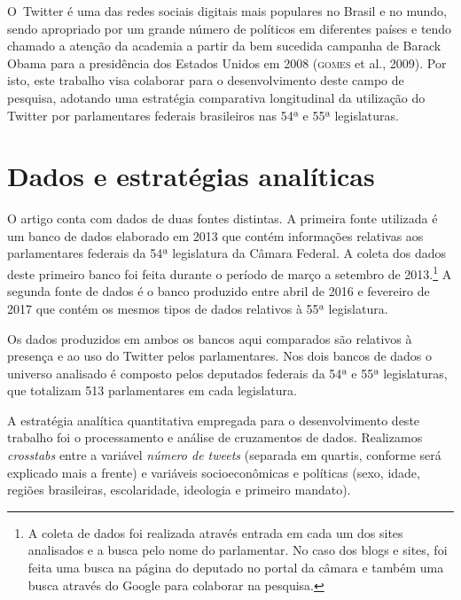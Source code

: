 O~Twitter é uma das redes sociais digitais mais populares no Brasil e no
mundo, sendo apropriado por um grande número de políticos em diferentes
países e tendo chamado a atenção da academia a partir da bem sucedida
campanha de Barack Obama para a presidência dos Estados Unidos em 2008
(\textsc{gomes} et al., 2009). Por isto, este trabalho visa colaborar para o
desenvolvimento deste campo de pesquisa, adotando uma estratégia
comparativa longitudinal da utilização do Twitter por parlamentares
federais brasileiros nas 54ª e 55ª legislaturas.

\section{Dados e estratégias analíticas}

O artigo conta com dados de duas fontes distintas. A primeira fonte
utilizada é um banco de dados elaborado em 2013 que contém informações
relativas aos parlamentares federais da 54ª legislatura da Câmara
Federal. A coleta dos dados deste primeiro banco foi feita durante o
período de março a setembro de 2013.\footnote{A coleta de dados foi
  realizada através entrada em cada um dos sites analisados e a busca
  pelo nome do parlamentar. No caso dos blogs e sites, foi feita uma
  busca na página do deputado no portal da câmara e também uma busca
  através do Google para colaborar na pesquisa.} A segunda fonte de
dados é o banco produzido entre abril de 2016 e fevereiro de 2017 que
contém os mesmos tipos de dados relativos à 55ª legislatura.

Os dados produzidos em ambos os bancos aqui comparados são relativos à
presença e ao uso do Twitter pelos parlamentares. Nos dois bancos de
dados o universo analisado é composto pelos deputados federais da 54ª e
55ª legislaturas, que totalizam 513 parlamentares em cada legislatura.

A estratégia analítica quantitativa empregada para o desenvolvimento
deste trabalho foi o processamento e análise de cruzamentos de dados.
Realizamos \emph{crosstabs} entre a variável \textit{número de tweets}
(separada em quartis, conforme será explicado mais a frente) e variáveis
socioeconômicas e políticas (sexo, idade, regiões brasileiras,
escolaridade, ideologia e primeiro mandato).

